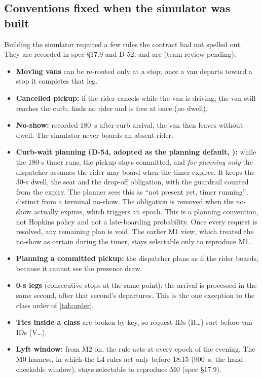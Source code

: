 \documentclass[11pt,letterpaper]{article}
\newcommand{\status}[2]{{\setlength{\fboxsep}{1.1pt}\fcolorbox{#1}{white}{\textcolor{#1}{\sffamily\scriptsize\strut #2}}}}
\newcommand{\Provisional}{\status{cProvisional}{provisional}}
\newcommand{\D}[1]{D-#1}
\begin{document}
\subsection{Conventions fixed when the simulator was built}\label{sec:conventions}
Building the simulator required a few rules the contract had not spelled out. They are recorded in spec §17.9 and \D{52}, and are \Provisional{} (team review pending):
\begin{itemize}
\item \textbf{Moving vans} can be re-routed only at a stop; once a van departs toward a stop it completes that leg.
\item \textbf{Cancelled pickup:} if the rider cancels while the van is driving, the van still reaches the curb, finds no rider and is free at once (no dwell).
\item \textbf{No-show:} recorded 180~s after curb arrival; the van then leaves without dwell. The simulator never boards an absent rider.
\item \textbf{Curb-wait planning (\D{54}, adopted as the planning default, \Provisional):} while the 180-s timer runs, the pickup stays committed, and \emph{for planning only} the dispatcher assumes the rider may board when the timer expires. It keeps the 30-s dwell, the seat and the drop-off obligation, with the guardrail counted from the expiry. The planner sees this as ``not present yet, timer running'', distinct from a terminal no-show. The obligation is removed when the no-show actually expires, which triggers an epoch. This is a planning convention, not Hopkins policy and not a late-boarding probability. Once every request is resolved, any remaining plan is void. The earlier M1 view, which treated the no-show as certain during the timer, stays selectable only to reproduce M1.
\item \textbf{Planning a committed pickup:} the dispatcher plans as if the rider boards, because it cannot see the presence draw.
\item \textbf{0-s legs} (consecutive stops at the same point): the arrival is processed in the same second, after that second's departures. This is the one exception to the class order of \cref{tab:order}.
\item \textbf{Ties inside a class} are broken by key, so request IDs (R\ldots) sort before van IDs (V\ldots).
\item \textbf{Lyft window:} from M2 on, the rule acts at every epoch of the evening. The M0 harness, in which the L4 rules act only before 18:15 (900~s, the hand-checkable window), stays selectable to reproduce M0 (spec §17.9).

\end{itemize}
\end{document}

